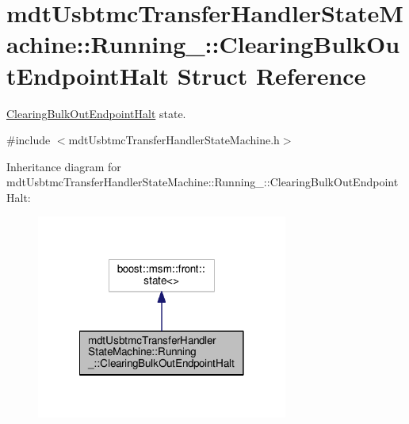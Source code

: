 \hypertarget{structmdt_usbtmc_transfer_handler_state_machine_1_1_running___1_1_clearing_bulk_out_endpoint_halt}{\section{mdt\-Usbtmc\-Transfer\-Handler\-State\-Machine\-:\-:Running\-\_\-\-:\-:Clearing\-Bulk\-Out\-Endpoint\-Halt Struct Reference}
\label{structmdt_usbtmc_transfer_handler_state_machine_1_1_running___1_1_clearing_bulk_out_endpoint_halt}
}


\hyperlink{structmdt_usbtmc_transfer_handler_state_machine_1_1_running___1_1_clearing_bulk_out_endpoint_halt}{Clearing\-Bulk\-Out\-Endpoint\-Halt} state.  




{\ttfamily \#include $<$mdt\-Usbtmc\-Transfer\-Handler\-State\-Machine.\-h$>$}



Inheritance diagram for mdt\-Usbtmc\-Transfer\-Handler\-State\-Machine\-:\-:Running\-\_\-\-:\-:Clearing\-Bulk\-Out\-Endpoint\-Halt\-:
\nopagebreak
\begin{figure}[H]
\begin{center}
\leavevmode
\includegraphics[width=234pt]{structmdt_usbtmc_transfer_handler_state_machine_1_1_running___1_1_clearing_bulk_out_endpoint_halt__inherit__graph}
\end{center}
\end{figure}



